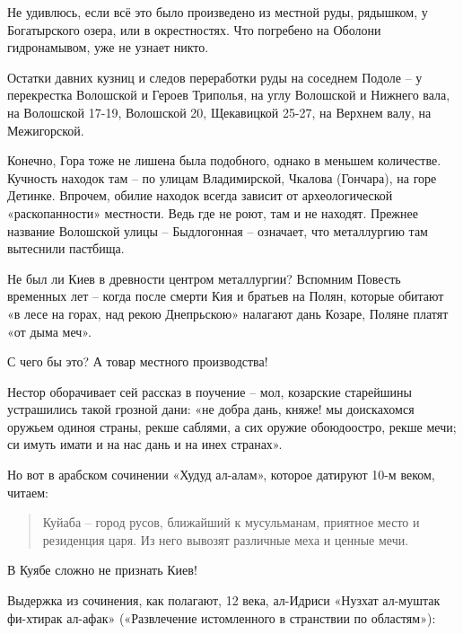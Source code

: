 Не удивлюсь, если всё это было произведено из местной руды, рядышком, у Богатырского озера, или в окрестностях. Что погребено на Оболони гидронамывом, уже не узнает никто.

Остатки давних кузниц и следов переработки руды на соседнем Подоле – у перекрестка Волошской и Героев Триполья, на углу Волошской и Нижнего вала, на Волошской 17-19, Волошской 20, Щекавицкой 25-27, на Верхнем валу, на Межигорской.

Конечно, Гора тоже не лишена была подобного, однако в меньшем количестве. Кучность находок там – по улицам Владимирской, Чкалова (Гончара), на горе Детинке. Впрочем, обилие находок всегда зависит от археологической «раскопанности» местности. Ведь где не роют, там и не находят. Прежнее название Волошской улицы – Быдлогонная – означает, что металлургию там вытеснили пастбища.

Не был ли Киев в древности центром металлургии? Вспомним Повесть временных лет – когда после смерти Кия и братьев на Полян, которые обитают «в лесе на горах, над рекою Днепрьскою» налагают дань Козаре, Поляне платят «от дыма меч».

С чего бы это? А товар местного производства!

Нестор оборачивает сей рассказ в поучение – мол, козарские старейшины устрашились такой грозной дани: «не добра дань, княже! мы доискахомся оружьем одиноя страны, рекше саблями, а сих оружие обоюдоостро, рекше мечи; си имуть имати и на нас дань и на инех странах».

Но вот в арабском сочинении «Худуд ал-алам», которое датируют 10-м веком, читаем\cite{vostistnovosel}:

\begin{quotation}
Куйаба – город русов, ближайший к мусульманам, приятное место и резиденция царя. Из него вывозят различные меха и ценные мечи.
\end{quotation}

В Куябе сложно не признать Киев!

Выдержка из сочинения, как полагают, 12 века, ал-Идриси «Нузхат ал-муштак фи-хтирак ал-афак» («Развлечение истомленного в странствии по областям»)\cite{vostistnovosel}: 

